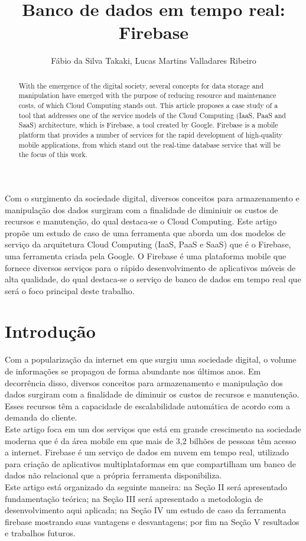\documentclass[12pt]{article}
\title{Banco de dados em tempo real: Firebase}
\author{Fábio da Silva Takaki\inst{1}, Lucas Martins Valladares Ribeiro\inst{1} }
\begin{document}
 

\maketitle

\begin{abstract}
   With the emergence of the digital society, several concepts for data storage and manipulation have emerged with the purpose of reducing resource and maintenance costs, of which Cloud Computing stands out. This article proposes a case study of a tool that addresses one of the service models of the Cloud Computing (IaaS, PaaS and SaaS) architecture, which is Firebase, a tool created by Google. Firebase is a mobile platform that provides a number of services for the rapid development of high-quality mobile applications, from which stand out the real-time database service that will be the focus of this work.
\end{abstract}
     
\begin{resumo} 
   Com o surgimento da sociedade digital, diversos conceitos para armazenamento e manipulação dos dados surgiram com a finalidade de diminiuir os custos de recursos e manutenção, do qual destaca-se o Cloud Computing. Este artigo propõe um estudo de caso de uma ferramenta que aborda um dos modelos de serviço da arquitetura Cloud Computing (IaaS, PaaS e SaaS) que é o Firebase, uma ferramenta criada pela Google. O Firebase é uma plataforma mobile que fornece diversos serviços para o rápido desenvolvimento de aplicativos móveis de alta qualidade, do qual destaca-se o serviço de banco de dados em tempo real que será o foco principal deste trabalho.
\end{resumo}


\section{Introdução}

Com a popularização da internet em que surgiu uma sociedade digital, o volume de informações se propagou de forma abundante nos últimos anos. Em decorrência disso, diversos conceitos para armazenamento e manipulação dos dados surgiram com a finalidade de diminuir os custos de recursos e manutenção. Esses recursos têm a capacidade de escalabilidade automática de acordo com a demanda do cliente.
\\
Este artigo foca em um dos serviços que está em grande crescimento na sociedade moderna que é da área mobile em que mais de 3,2 bilhões de pessoas têm acesso a internet. Firebase é um serviço de dados em nuvem em tempo real, utilizado para criação de aplicativos multiplataformas em que compartilham um banco de dados não relacional que a própria ferramenta disponibiliza.
\\
Este artigo está organizado da seguinte maneira: na Seção II será apresentado fundamentação teórica; na Seção III será apresentado a metodologia de desenvolvimento aqui aplicada; na Seção IV um estudo de caso da ferramenta firebase mostrando suas vantagens e desvantagens; por fim na Seção V resultados e trabalhos futuros.
\end{document}
